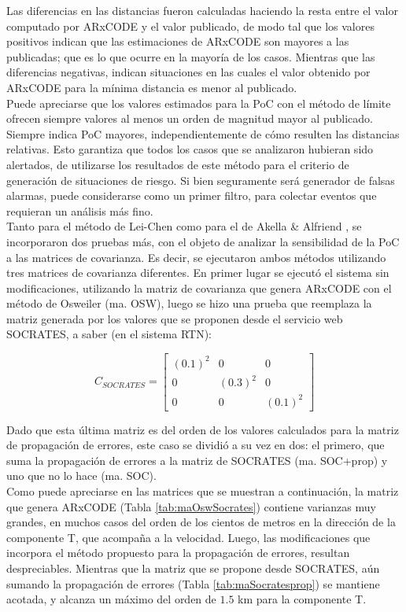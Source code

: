 Las diferencias en las distancias fueron calculadas haciendo la resta entre el valor computado por ARxCODE y el valor publicado, de modo tal que los valores positivos indican que las estimaciones de ARxCODE son mayores a las publicadas; que es lo que ocurre en la mayoría de los casos. Mientras que las diferencias negativas, indican situaciones en las cuales el valor obtenido por ARxCODE para la m\'inima distancia es menor al publicado.\\

Puede apreciarse que los valores estimados para la PoC con el m\'etodo de l\'imite ofrecen siempre valores al menos un orden de magnitud mayor al publicado. Siempre indica PoC mayores, independientemente de c\'omo resulten las distancias relativas. Esto garantiza que todos los casos que se analizaron hubieran sido alertados, de utilizarse los resultados de este m\'etodo para el criterio de generaci\'on de situaciones de riesgo. Si bien seguramente ser\'a generador de falsas alarmas, puede considerarse como un primer filtro, para colectar eventos que requieran un an\'alisis m\'as fino.\\

Tanto para el m\'etodo de Lei-Chen \citep{leichen} como para el de Akella \& Alfriend \citep{akellaAlfriend}, se incorporaron dos pruebas m\'as, con el objeto de analizar la sensibilidad de la PoC a las matrices de covarianza. Es decir, se ejecutaron ambos m\'etodos utilizando tres matrices de covarianza diferentes. En primer lugar se ejecut\'o el sistema sin modificaciones, utilizando la matriz de covarianza que genera ARxCODE con el m\'etodo de Osweiler (ma. OSW), luego se hizo una prueba que reemplaza la matriz generada por los valores que se proponen desde el servicio web SOCRATES, a saber (en el sistema RTN):

$$
 C_{SOCRATES}=
\begin{bmatrix}
    (0.1)^{2} & 0 & 0  \\
    0 & (0.3)^{2} & 0  \\
    0 & 0 & (0.1)^{2} 
\end{bmatrix}
$$

Dado que esta \'ultima matriz es del orden de los valores calculados para la matriz de propagaci\'on de errores, este caso se dividi\'o a su vez en dos: el primero, que suma la propagaci\'on de errores a la matriz de SOCRATES (ma. SOC+prop) y uno que no lo hace (ma. SOC).\\

Como puede apreciarse en las matrices que se muestran a continuaci\'on, la matriz que genera ARxCODE (Tabla \ref{tab:maOswSocrates}) contiene varianzas muy grandes, en muchos casos del orden de los cientos de metros en la direcci\'on de la componente T, que acompaña a la velocidad. Luego, las modificaciones que incorpora el m\'etodo propuesto para la propagaci\'on de errores, resultan despreciables. Mientras que la matriz que se propone desde SOCRATES, a\'un sumando la propagaci\'on de errores (Tabla \ref{tab:maSocratesprop}) se mantiene acotada, y alcanza un m\'aximo del orden de $1.5$ km para la componente T.\\

